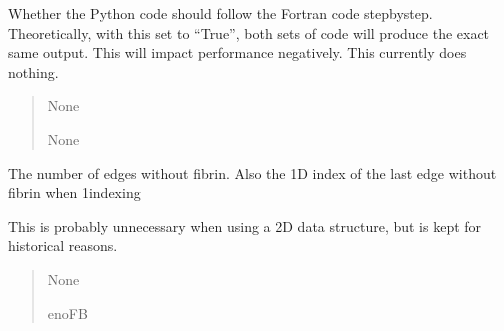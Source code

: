 \documentclass[letterpaper,10pt,english]{sphinxmanual}
\begin{document}
\begin{fulllineitems}
\begin{fulllineitems}
\end{fulllineitems}


\begin{fulllineitems}
\label{\detokenize{lysis.util:lysis.util.parameters.MacroParameters.duplicate_fortran}}
\pysigstartsignatures
{}
\pysigstopsignatures
\sphinxAtStartPar
Whether the Python code should follow the Fortran code step\sphinxhyphen{}by\sphinxhyphen{}step.
Theoretically, with this set to “True”, both sets of code will produce the
exact same output.
This will impact performance negatively.
This currently does nothing.
\begin{quote}\begin{description}
\sphinxAtStartPar
None

\sphinxAtStartPar
None

\end{description}\end{quote}

\end{fulllineitems}


\begin{fulllineitems}
\label{\detokenize{lysis.util:lysis.util.parameters.MacroParameters.empty_edges}}
\pysigstartsignatures
{}
\pysigstopsignatures
\sphinxAtStartPar
The number of edges without fibrin.
Also the 1\sphinxhyphen{}D index of the last edge without fibrin when 1\sphinxhyphen{}indexing

\sphinxAtStartPar
This is probably unnecessary when using a 2\sphinxhyphen{}D data structure, but is kept
for historical reasons.
\begin{quote}\begin{description}
\sphinxAtStartPar
None

\sphinxAtStartPar
enoFB


\end{description}
\end{quote}
\end{fulllineitems}
\end{fulllineitems}
\end{document}

